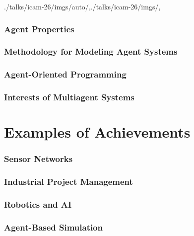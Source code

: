 \begin{bibliographysection}
\begin{graphicspathcontext}{{./talks/icam-26/imgs/auto/},{./talks/icam-26/imgs/},\old}
\section{Agent Properties}
\localized

\section{Methodology for Modeling Agent Systems}
\localized

\section{Agent-Oriented Programming}
\localized

\section{Interests of Multiagent Systems}
\localized

\part[subtitle={Mostly from the CIAD laboratory}]{Examples of Achievements}

\section{Sensor Networks}
\localized

\section{{Industrial Project} Management}
\localized

\section{Robotics and AI}
\localized
\localized
\localized

\section{Agent-Based Simulation}
\localized


\end{graphicspathcontext}
\end{bibliographysection}
